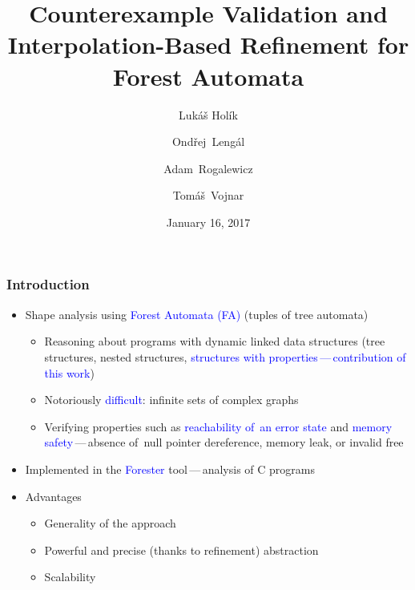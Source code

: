 \documentclass{beamer}
\title{
 Counterexample Validation and Interpolation-Based
Refinement for Forest Automata}
\author[
  Hol\'{i}k \and 
  \textbf{\hlbl{Hru\v{s}ka}} \and
  Leng\'{a}l \and
  Rogalewicz \and
  Vojnar~~~~~]
{
  Luk\'{a}\v{s} Hol\'{i}k \and 
  \hlbl{\textbf{ Martin Hru\v{s}ka}} \and
  Ond\v{r}ej~Leng\'{a}l \and
  Adam~Rogalewicz\\ \and
  Tom\'{a}\v{s}~Vojnar}
\institute[BUT]{Brno University of Technology, Czech Republic\\[6mm]
@VMCAI'17, Paris}
\date{January 16, 2017}
\newcommand{\hlbl}[1]{\textcolor{blue}{#1}}
\newcommand{\hlgr}[1]{\textcolor{olive!50!green}{#1}}
\begin{document}

\begin{frame}[plain]
  \titlepage
\end{frame}

\begin{frame}
  \frametitle{Introduction}
  \begin{itemize}
	  \item Shape analysis using \hlbl{Forest Automata (FA)}
		  (tuples of tree automata)
		  \begin{itemize}
			\item Reasoning about programs with dynamic linked data structures
				(tree structures, nested structures, \hlbl{structures with properties\,---\,contribution of this work})
			\item Notoriously \hlbl{difficult}: infinite sets of complex graphs
			\item Verifying properties such as \hlbl{reachability of~an error state} and \hlbl{memory safety}\,---\,absence of~null pointer dereference,
			  memory leak, or invalid free
	  \end{itemize}
	  \pause
	  	  \item Implemented in the \hlbl{Forester} tool\,---\,analysis of C programs
	  \item \hlgr{Advantages}
	   \begin{itemize}
		 \item Generality of the approach
		 \item Powerful and precise (thanks to refinement) abstraction
		 \item Scalability
	   \end{itemize}

  \end{itemize}
\end{frame}
\end{document}
